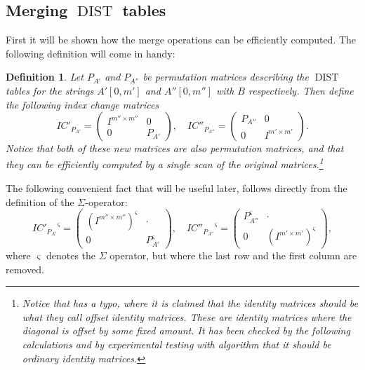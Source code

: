 \documentclass[twoside,11pt,openright]{report}
\newcommand{\DIST}{\operatorname{DIST}}
\newcommand{\str}[3]{#1[#2, #3]}
\newtheorem{mydef}{Definition}
\begin{document}
\subsection{Merging $\DIST$ tables}
\label{sec:merging-dists}
First it will be shown how the merge operations can be efficiently computed. The following definition will come in handy:
\begin{mydef}
  Let $P_{A'}$ and $P_{A''}$ be permutation matrices describing the $\DIST$ tables for the strings $\str{A'}{0}{m'}$ and $\str{A''}{0}{m''}$ with $B$ respectively. Then define the following index change matrices
  \[
    IC'_{P_{A'}} = \begin{pmatrix}
      I^{m'' \times m''} & 0 \\
      0 & P_{A'}
    \end{pmatrix}, \quad
    IC''_{P_{A''}} = \begin{pmatrix}
      P_{A''} & 0 \\
      0 & I^{m' \times m'}
    \end{pmatrix}.
  \]
  Notice that both of these new matrices are also permutation matrices, and that they can be efficiently computed by a single scan of the original matrices.\footnote{Notice that \cite[p. 55, Theorem 4.19]{DBLP:journals/corr/abs-0707-3619} has a typo, where it is claimed that the identity matrices should be what they call offset identity matrices. These are identity matrices where the diagonal is offset by some fixed amount. It has been checked by the following calculations and by experimental testing with algorithm that it should be ordinary identity matrices.}
\end{mydef}

The following convenient fact that will be useful later, follows directly from the definition of the $\Sigma$-operator:
\[
  {IC'_{P_{A'}}}^{\varsigma} = \begin{pmatrix}
    (I^{m'' \times m''})^{\varsigma} & \cdot \\
    0 & P_{A'}^{\varsigma}
  \end{pmatrix}, \quad
  {IC''_{P_{A''}}}^{\varsigma} = \begin{pmatrix}
    P_{A''}^{\varsigma} & \cdot \\
    0 & (I^{m' \times m'})^{\varsigma}
  \end{pmatrix},
\]
where $\varsigma$ denotes the $\Sigma$ operator, but where the last row and the first column are removed.
\end{document}
